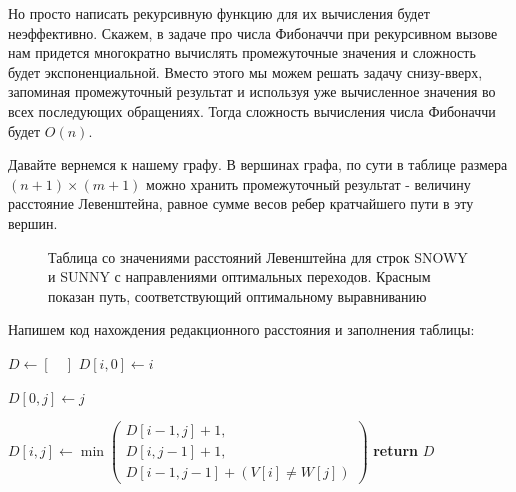 \documentclass[letterpaper, 11pt]{article}
\begin{document}
Но просто написать рекурсивную функцию для их вычисления будет неэффективно. Скажем, в задаче про числа Фибоначчи при рекурсивном вызове нам придется многократно вычислять промежуточные значения и сложность будет экспоненциальной. Вместо этого мы можем решать задачу снизу-вверх, запоминая промежуточный результат и используя уже вычисленное значения во всех последующих обращениях. Тогда сложность вычисления числа Фибоначчи будет $O(n)$.

Давайте вернемся к нашему графу. В вершинах графа, по сути в таблице размера $(n+1) \times (m+1)$ можно хранить промежуточный результат - величину расстояние Левенштейна, равное сумме весов ребер кратчайшего пути в эту вершин.

\begin{figure}[H]
  \caption{Таблица со значениями расстояний Левенштейна для строк SNOWY и SUNNY с направлениями оптимальных переходов. Красным показан путь, соответствующий оптимальному выравниванию}
\end{figure}

Напишем код нахождения редакционного расстояния и заполнения таблицы:

\begin{algorithmic}[1]
\State $D\gets [\quad]$
\State $D[i,0]\gets i$
\EndFor

\State $D[0,j]\gets j$
\EndFor

\State $D[i,j]\gets
\min
\begin{pmatrix} D[i-1,j]+1, \\
	 D[i,j-1]+1, \\
	 D[i-1,j-1]+(V[i]\ne W[j])
\end{pmatrix}$
\EndFor
\EndFor
\State \textbf{return} $D$
\EndProcedure
\end{algorithmic}
\end{document}
